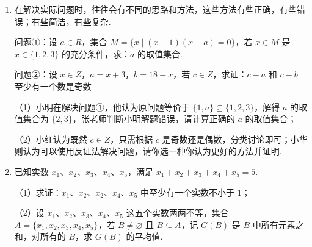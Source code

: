 \documentclass[a4paper,11pt]{article}
\begin{document}
\begin{enumerate}
\item 在解决实际问题时，往往会有不同的思路和方法，这些方法有些正确，有些错误；有些简洁，有些复杂.

问题①：设 $a\in R$，集合 $M=\{x\mid(x-1)(x-a)=0\}$，若 $x\in M$ 是 $x\in\{1,2,3\}$ 的充分条件，求：$a$ 的取值集合.

问题②：设 $x\in Z$，$a=x+3$，$b=18-x$，若 $c\in Z$，求证：$c-a$ 和 $c-b$ 至少有一个数是奇数

（1）小明在解决问题①，他认为原问题等价于 $\{1,a\}\subseteq\{1,2,3\}$，解得 $a$ 的取值集合为 $\{2,3\}$，张老师判断小明解题错误，请计算正确的 $a$ 的取值集合；

（2）小红认为既然 $c\in Z$，只需根据 $c$ 是奇数还是偶数，分类讨论即可；小华则认为可以使用反证法解决问题，请你选一种你认为更好的方法并证明.

\ansspace*[12]

\ifanswer
\solbegin
{}
\solend
\fi

\item 已知实数 $x_1$、$x_2$、$x_3$、$x_4$、$x_5$，满足 $x_1+x_2+x_3+x_4+x_5=5$.

（1）求证：$x_1$、$x_2$、$x_2$、$x_4$、$x_5$ 中至少有一个实数不小于 $1$；%

（2）设 $x_1$、$x_2$、$x_3$、$x_4$、$x_5$ 这五个实数两两不等，集合 $A=\{x_1,x_2,x_3,x_4,x_5\}$，若 $B\neq\varnothing$ 且 $B\subseteq A$，记 $G(B)$ 是 $B$ 中所有元素之和，对所有的 $B$，求 $G(B)$ 的平均值.

\ansspace*[13]

\ifanswer
\solbegin
{}%
\solend
\fi

\end{enumerate}
\end{document}

